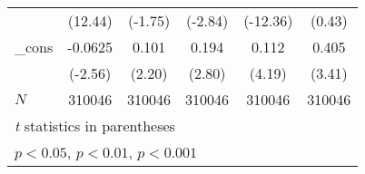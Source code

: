\begin{table}[htbp]
\begin{tabular}{l*{5}{c}}
            &     (12.44)         &     (-1.75)         &     (-2.84)         &    (-12.36)         &      (0.43)         \\
\_cons      &     -0.0625\sym{*}  &       0.101\sym{*}  &       0.194\sym{**} &       0.112\sym{***}&       0.405\sym{***}\\
            &     (-2.56)         &      (2.20)         &      (2.80)         &      (4.19)         &      (3.41)         \\
\hline
\(N\)       &      310046         &      310046         &      310046         &      310046         &      310046         \\
\hline\hline
\multicolumn{6}{l}{\footnotesize \textit{t} statistics in parentheses}\\
\multicolumn{6}{l}{\footnotesize \sym{*} \(p<0.05\), \sym{**} \(p<0.01\), \sym{***} \(p<0.001\)}\\
\end{tabular}
\end{table}
